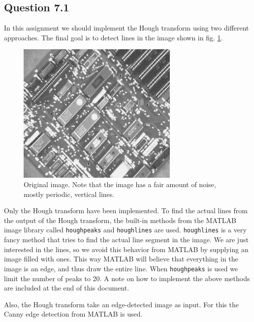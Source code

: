 \documentclass[a4paper, 10pt, final]{article}
\title{\mytitle}
\subtitle{\mysubtitle}
\author{\myauthor{} - \mymail}
\date{\mydate}
\begin{document}
\maketitle

\subsection*{Question 7.1}
In this assignment we should implement the Hough transform using two
different approaches. The final goal is to detect lines in the image
shown in fig. \ref{apple}.

\begin{figure}[h!]
    \centering
    \includegraphics[angle=0,width=0.7\textwidth]{images/apple}
    \caption{Original image. Note that the image has a fair amount of
    noise, mostly periodic, vertical lines.}
    \label{apple}
\end{figure}

Only the Hough transform have been implemented. To find the
actual lines from the output of the Hough transform, the built-in
methods from the MATLAB image library called \texttt{houghpeaks} and
\texttt{houghlines} are used. \texttt{houghlines} is a very fancy method
that tries to find the actual line segment in the image. We are just
interested in the lines, so we avoid this behavior from MATLAB by
supplying an image filled with ones. This way MATLAB will believe that
everything in the image is an edge, and thus draw the entire line. When
\texttt{houghpeaks} is used we limit the number of peaks to 20. A note
on how to implement the above methods are included at the end of this
document.

Also, the Hough transform take an edge-detected image as input. For this
the Canny edge detection from MATLAB is used.
\end{document}
